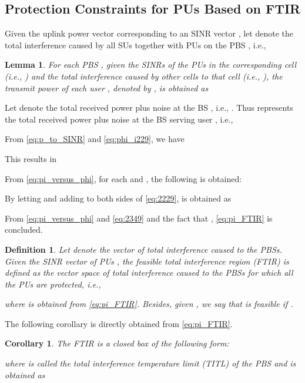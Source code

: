 \documentclass[journal,twoside]{IEEEtran}
\newcommand{\M}{\mathcal{M}}
\newtheorem {corollary}{Corollary}
\newtheorem {lemma}{Lemma}
\newtheorem {definition}{Definition}
\begin{document}
\subsection{Protection Constraints for PUs Based on FTIR}
	Given the uplink power vector  corresponding to an SINR vector , let  denote the total interference caused by all SUs together with PUs  on the PBS , i.e.,
	
\begin{lemma}
		For each PBS , given the SINRs of the PUs in the corresponding cell (i.e., ) and the total interference caused by other cells to that cell (i.e., ), the transmit power of each user , denoted by , is obtained as
		
	\end{lemma}
	\begin{IEEEproof}
		Let  denote the total received power plus noise at the BS , i.e., . Thus  represents the total received power plus noise at the BS serving user , i.e., 
		
From {\eqref{eq:p_to_SINR}} and {\eqref{eq:phi_i229}}, we have 
		
		This results in
		
		From {\eqref{eq:pi_versus_phi}}, for each  and , the following is obtained:
		
		By letting  and adding  to both sides of {\eqref{eq:2229}},  is obtained as
		
		From \eqref{eq:pi_versus_phi} and \eqref{eq:2349} and the fact that , \eqref{eq:pi_FTIR} is concluded.
	\end{IEEEproof}
	\begin{definition}
	\label{def:total_feasible_interference}
		Let  denote the vector of total interference  caused to the PBSs. Given the SINR vector of PUs , the feasible total interference region (FTIR)  is defined as the vector space of total interference caused to the PBSs for which all the PUs are protected, i.e., 
		
		where  is obtained from \eqref{eq:pi_FTIR}. Besides, given , we say that  is feasible if .
	\end{definition}
	The following corollary is directly obtained from \eqref{eq:pi_FTIR}.


	\newcommand{\minp}{\min\limits_{i\in\M_m}\!\!\left(\frac{p_i^{\mathrm{max}} h_{mi}(\gamma_i+1)}{\gamma_i}\right)}
	\begin{corollary}
		\label{col:FTIR}
		The FTIR is a closed box of the following form:
		
		where  is called the total interference temperature limit (TITL) of the PBS  and is obtained as
		
	\end{corollary}
\end{document}

